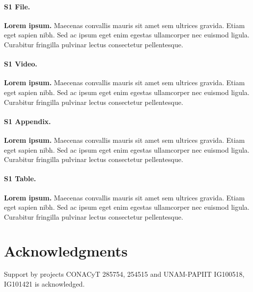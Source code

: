 \documentclass[10pt,letterpaper]{article} %
\begin{document}
\paragraph*{S1 File.}
\label{S1_File}
{\bf Lorem ipsum.}  Maecenas convallis mauris sit amet sem ultrices gravida. Etiam eget sapien nibh. Sed ac ipsum eget enim egestas ullamcorper nec euismod ligula. Curabitur fringilla pulvinar lectus consectetur pellentesque.

\paragraph*{S1 Video.}
\label{S1_Video}
{\bf Lorem ipsum.}  Maecenas convallis mauris sit amet sem ultrices gravida. Etiam eget sapien nibh. Sed ac ipsum eget enim egestas ullamcorper nec euismod ligula. Curabitur fringilla pulvinar lectus consectetur pellentesque.

\paragraph*{S1 Appendix.}
\label{S1_Appendix}
{\bf Lorem ipsum.} Maecenas convallis mauris sit amet sem ultrices gravida. Etiam eget sapien nibh. Sed ac ipsum eget enim egestas ullamcorper nec euismod ligula. Curabitur fringilla pulvinar lectus consectetur pellentesque.

\paragraph*{S1 Table.}
\label{S1_Table}
{\bf Lorem ipsum.} Maecenas convallis mauris sit amet sem ultrices gravida. Etiam eget sapien nibh. Sed ac ipsum eget enim egestas ullamcorper nec euismod ligula. Curabitur fringilla pulvinar lectus consectetur pellentesque.
\section{Acknowledgments} %
Support by projects CONACyT 285754, 254515 and UNAM-PAPIIT IG100518, IG101421 is
acknowledged. 


\nolinenumbers

%
%
% 
%
\end{document}
